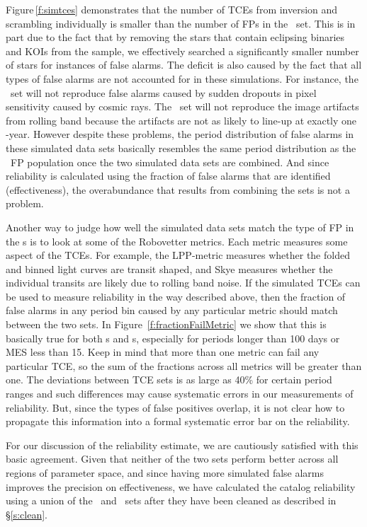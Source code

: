 Figure\,\ref{f:simtces} demonstrates that the number of TCEs from inversion and scrambling individually is smaller than the number of FPs in the \opstce\ set. This is in part due to the fact that by removing the stars that contain eclipsing binaries and KOIs from the sample, we effectively searched a significantly smaller number of stars for instances of false alarms. The deficit is also caused by the fact that all types of false alarms are not accounted for in these simulations. For instance, the \invtce\ set will not reproduce false alarms caused by sudden dropouts in pixel sensitivity caused by cosmic rays. The \scrtce\ set will not reproduce the image artifacts from rolling band because the artifacts are not as likely to line-up at exactly one \Kepler -year.  However despite these problems, the period distribution of false alarms in these simulated data sets basically resembles the same period distribution as the \opstce\ FP population once the two simulated data sets are combined. And since reliability is calculated using the fraction of false alarms that are identified (effectiveness), the overabundance that results from combining the sets is not a problem.

Another way to judge how well the simulated data sets match the type of FP in the \opstce s is to look at some of the Robovetter metrics.  Each metric measures some aspect of the TCEs. For example, the LPP-metric measures whether the folded and binned light curves are transit shaped, and Skye measures whether the individual transits are likely due to rolling band noise.  If the simulated TCEs can be used to measure reliability in the way described above, then the fraction of false alarms in any period bin caused by any particular metric should match between the two sets.  In Figure~\ref{f:fractionFailMetric} we show that this is basically true for both \invtce s and \scrtce s, especially for periods longer than 100 days or MES less than 15.  Keep in mind that more than one metric can fail any particular TCE, so the sum of the fractions across all metrics will be greater than one.  The deviations between TCE sets is as large as 40\% for certain period ranges and such differences may cause systematic errors in our measurements of reliability.  But, since the types of false positives overlap, it is not clear how to propagate this information into a formal systematic error bar on the reliability.  

For our discussion of the reliability estimate, we are cautiously satisfied with this basic agreement. Given that neither of the two sets perform better across all regions of parameter space, and since having more simulated false alarms improves the precision on effectiveness,  we have calculated the catalog reliability using a union of the \scrtce\ and \invtce\ sets after they have been cleaned as described in \S\ref{s:clean}.  


